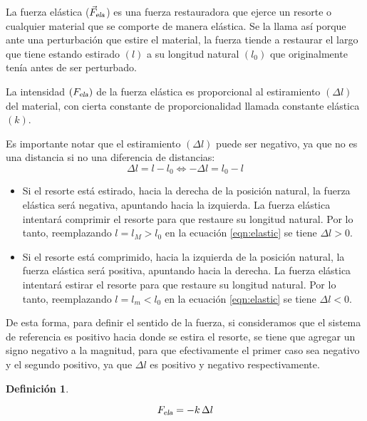 \documentclass[a5paper,12pt,twoside]{book}
\newtheorem{defn}{{Definición}}[chapter]
\begin{document}
La fuerza elástica (${{\Vec{F}}_\textsl{{ela}}}$) es una fuerza restauradora que ejerce un resorte o cualquier material que se comporte de manera elástica.
Se la llama así porque ante una perturbación que estire el material, la fuerza tiende a restaurar el largo que tiene estando estirado $(l)$ a su longitud natural $(l_0)$ que originalmente tenía antes de ser perturbado.

La intensidad $({{F}_\textsl{{ela}}})$ de la fuerza elástica es proporcional al estiramiento $(\Delta l)$ del material, con cierta constante de proporcionalidad llamada constante elástica $(k)$.

\begin{center}
    \def\svgwidth{0.7\linewidth}
    
\end{center}

Es importante notar que el estiramiento $(\Delta l)$ puede ser negativo, ya que no es una distancia si no una diferencia de distancias:
\begin{equation}
    \Delta l = l-l_0 \iff -\Delta l = l_0-l
    \label{eqn:elastic}
\end{equation}

\begin{itemize}
    \item
    Si el resorte está estirado, hacia la derecha de la posición natural, la fuerza elástica será negativa, apuntando hacia la izquierda.
    La fuerza elástica intentará comprimir el resorte para que restaure su longitud natural.
    Por lo tanto, reemplazando $l=l_M>l_0$ en la ecuación \ref{eqn:elastic} se tiene $\Delta l>0$.
    
    \item
    Si el resorte está comprimido, hacia la izquierda de la posición natural, la fuerza elástica será positiva, apuntando hacia la derecha.
    La fuerza elástica intentará estirar el resorte para que restaure su longitud natural.
    Por lo tanto, reemplazando $l=l_m<l_0$ en la ecuación \ref{eqn:elastic} se tiene $\Delta l<0$.
\end{itemize}

De esta forma, para definir el sentido de la fuerza, si consideramos que el sistema de referencia es positivo hacia donde se estira el resorte, se tiene que agregar un signo negativo a la magnitud, para que efectivamente el primer caso sea negativo y el segundo positivo, ya que $\Delta l$ es positivo y negativo respectivamente.

\begin{mdframed}[style=MyFrame1]
    \begin{defn}
        \label{defn:elasticForce}
    \end{defn}
    \begin{equation*}
        {{F}_\textsl{{ela}}} = -k \, \Delta l
    \end{equation*}
\end{mdframed}
\end{document}
